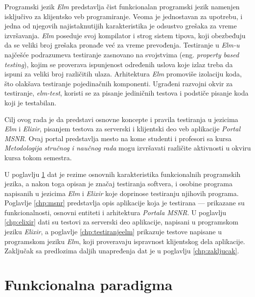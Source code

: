 \documentclass[12pt,oneside]{memoir}
\begin{document}
\par Programski jezik \emph{Elm} predstavlja čist funkcionalan programski jezik namenjen isključivo za klijentsko veb programiranje. Veoma je jednostavan za upotrebu, i jedna od njegovih najistaknutijih karakteristika je odsustvo grešaka za vreme izvršavanja. \emph{Elm} poseduje svoj kompilator i strog sistem tipova, koji obezbeđuju da se veliki broj grešaka pronađe već za vreme prevođenja. Testiranje u \emph{Elm-u} najčešće podrazumeva testiranje zasnovano na svojstvima (eng. \emph{property based testing}), kojim se proverava ispunjenost određenih uslova koje izlaz treba da ispuni za veliki broj različitih ulaza. Arhitektura \emph{Elm} promoviše izolaciju koda, što olakšava testiranje pojedinačnih komponenti. Ugrađeni razvojni okvir za testiranje, \emph{elm-test}, koristi se za pisanje jediničnih testova i podstiče pisanje koda koji je testabilan.
\par Cilj ovog rada je da predstavi osnovne koncepte i pravila testiranja u jezicima \emph{Elm} i \emph{Elixir}, pisanjem testova za serverski i klijentski deo veb aplikacije \emph{Portal MSNR}. Ovaj portal predstavlja mesto na kome studenti i profesori sa kursa \emph{Metodologija stručnog i naučnog rada} mogu izvršavati različite aktivnosti u okviru kursa tokom semestra. 
\par U poglavlju \ref{chp:uvodnideo} dat je rezime osnovnih karakteristika funkcionalnih programskih jezika, a nakon toga opisan je značaj testiranja softvera, i osobine programa napisanih u jezicima \emph{Elm} i \emph{Elixir} koje doprinose testiranju njihovih programa. Poglavlje \ref{chp:msnr} predstavlja opis aplikacije koja je testirana --- prikazane su funkcionalnosti, osnovni entiteti i arhitektura \emph{Portala MSNR}. U poglavlju \ref{chp:elixir} dati su testovi za serverski deo aplikacije, napisani u programskom jeziku \emph{Elixir}, a poglavlje \ref{chp:testiranjeelm} prikazuje testove napisane u programskom jeziku \emph{Elm}, koji proveravaju ispravnost klijentskog dela aplikacije. Zaključak sa predlozima daljih unapređenja dat je u poglavlju \ref{chp:zakljucak}. 



\chapter{Funkcionalna paradigma}
\label{chp:uvodnideo}
\end{document}
